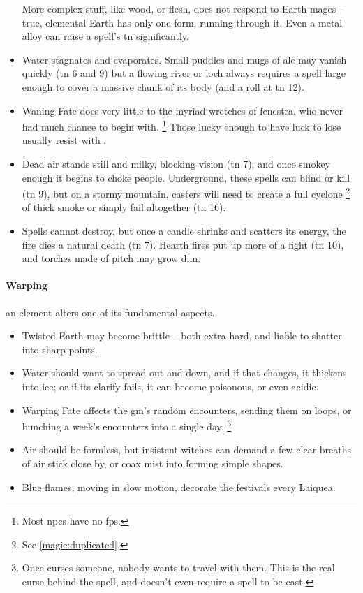 \begin{multicols}{2}
\begin{itemize}
  More complex stuff, like wood, or flesh, does not respond to Earth mages -- true, elemental Earth has only one form, running through it.
  Even a metal alloy can raise a spell's \gls{tn} significantly.
  \item
  Water stagnates and evaporates.
  Small puddles and mugs of ale may vanish quickly (\gls{tn} 6 and 9)
  but a flowing river or loch always requires a spell large enough to cover a massive chunk of its body (and a roll at \gls{tn} 12).
  \item
  Waning Fate does very little to the myriad wretches of \gls{fenestra}, who never had much chance to begin with.%
  \footnote{Most \glspl{npc} have no \glspl{fp}.}
  Those lucky enough to have luck to lose usually resist with .
  \item
  Dead air stands still and milky, blocking vision (\gls{tn} 7);
  and once smokey enough it begins to choke people.
  Underground, these spells can blind or kill (\gls{tn} 9), but on a stormy mountain, casters will need to create a full cyclone%
  \footnote{See \vref{magic:duplicated}.}
  of thick smoke or simply fail altogether (\gls{tn} 16).
  \item
  Spells cannot destroy, but once a candle shrinks and scatters its energy, the fire dies a natural death (\gls{tn} 7).
  Hearth fires put up more of a fight (\gls{tn} 10), and torches made of pitch may grow dim.
\end{itemize}

\paragraph{Warping}
an element alters one of its fundamental aspects.

\begin{itemize}
  \item
  Twisted Earth may become brittle -- both extra-hard, and liable to shatter into sharp points.
  \item
  Water should want to spread out and down, and if that changes, it thickens into ice;
  or if its clarify fails, it can become poisonous, or even acidic.
  \item
  Warping Fate affects the \gls{gm}'s random encounters, sending them on loops, or bunching a week's encounters into a single day.%
  \footnote{Once  curses someone, nobody wants to travel with them.  This is the real curse behind the spell, and doesn't even require a spell to be cast.}
  \item
  Air should be formless, but insistent witches can demand a few clear breaths of air stick close by, or coax mist into forming simple shapes.
  \item
  Blue flames, moving in slow motion, decorate the festivals every \gls{Laiquea}.
\end{itemize}


\end{multicols}
